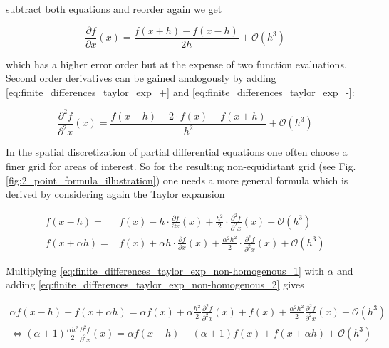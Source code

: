 \documentclass{scrartcl}[12pt, halfparskip]
\numberwithin{equation}{section}
\numberwithin{figure}{section}
\numberwithin{table}{section}
\begin{document}
subtract both equations and reorder again we get

\begin{equation}
\frac{\partial f}{\partial x}(x) = \frac{f(x+h) - f(x-h)}{2 h} + \mathcal{O}(h^3)
\end{equation}

which has a higher error order but at the expense of two function evaluations. \\

Second order derivatives can be gained analogously by adding \eqref{eq:finite_differences_taylor_exp_+} and \eqref{eq:finite_differences_taylor_exp_-}:

\begin{equation}
\frac{\partial^2 f}{\partial^2 x}(x) = \frac{f(x-h) - 2 \cdot f(x) + f(x+h)}{h^2} + \mathcal{O}(h^3)
\label{eq:finite_difference_2nd_der}
\end{equation}





In the spatial discretization of partial differential equations one often choose a finer grid for areas of interest. So for the resulting non-equidistant grid (see Fig. \ref{fig:2_point_formula_illustration}) one needs a more general formula which is derived by considering again the Taylor expansion





\begin{subequations}
	\label{eq:finite_differences_taylor_exp_non-homogenous}
	\begin{align}
	f(x-h) = & f(x) - h \cdot \frac{\partial f}{\partial x}(x) + \frac{h^2}{2} \cdot \frac{\partial^2 f}{\partial^2 x}(x) + \mathcal{O}(h^3) \label{eq:finite_differences_taylor_exp_non-homogenous_1} \\
	f(x+\alpha h) = & f(x) + \alpha h \cdot \frac{\partial f}{\partial x}(x) + \frac{\alpha^2 h^2}{2} \cdot \frac{\partial^2 f}{\partial^2 x}(x) + \mathcal{O}(h^3)  \label{eq:finite_differences_taylor_exp_non-homogenous_2}
	\end{align}
\end{subequations}



Multiplying \eqref{eq:finite_differences_taylor_exp_non-homogenous_1} with $\alpha$ and adding \eqref{eq:finite_differences_taylor_exp_non-homogenous_2} gives

\begin{align}
\alpha f(x-h) + f(x+\alpha h) = \alpha f(x) + \alpha \frac{h^2}{2} \frac{\partial^2 f}{\partial^2 x}(x) + f(x) + \frac{\alpha^2 h^2}{2} \frac{\partial^2 f}{\partial^2 x}(x) + \mathcal{O}(h^3)  \\
\Leftrightarrow (\alpha+1) \frac{\alpha h^2}{2} \frac{\partial^2 f}{\partial^2 x}(x) = \alpha f(x-h) - (\alpha+1) f(x) + f(x+\alpha h) + \mathcal{O}(h^3) 
\end{align}
\end{document}
